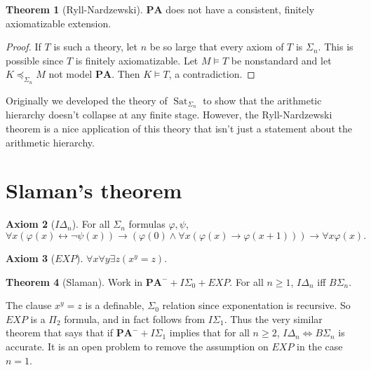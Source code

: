 \documentclass[12pt]{report}
\renewcommand{\iff}{\leftrightarrow}
\newcommand{\PA}{\mathbf{PA}}
\DeclareMathOperator{\Sat}{Sat}
\theoremstyle{definition}
\newtheorem{theorem}{Theorem}[chapter]
\newtheorem{axiom}[theorem]{Axiom}
\begin{document}
\begin{theorem}[Ryll-Nardzewski]
$\PA$ does not have a consistent, finitely axiomatizable extension.
\end{theorem}
\begin{proof}
If $T$ is such a theory, let $n$ be so large that every axiom of $T$ is $\Sigma_n$. This is possible since $T$ is finitely axiomatizable. Let $M \models T$ be nonstandard and let $K \preceq_{\Sigma_n} M$ not model $\PA$. Then $K \models T$, a contradiction.
\end{proof}

Originally we developed the theory of $\Sat_{\Sigma_n}$ to show that the arithmetic hierarchy doesn't collapse at any finite stage. However, the Ryll-Nardzewski theorem is a nice application of this theory that isn't just a statement about the arithmetic hierarchy.

\section{Slaman's theorem}
\begin{axiom}[$I\Delta_n$]
For all $\Sigma_n$ formulas $\varphi,\psi$,
$$\forall x(\varphi(x)\iff\neg\psi(x))\to (\varphi(0)\wedge\forall x(\varphi(x)\to\varphi(x+1)))\to\forall x\varphi(x).$$
\end{axiom}
\begin{axiom}[$EXP$]
$\forall x\forall y\exists z(x^y=z)$.
\end{axiom}
\begin{theorem}[Slaman]
Work in $\PA^-+I\Sigma_0+EXP$. For all $n \geq 1$, $I\Delta_n$ iff $B\Sigma_n$.
\end{theorem}
The clause $x^y=z$ is a definable, $\Sigma_0$ relation since exponentation is recursive. So $EXP$ is a $\Pi_2$ formula, and in fact follows from $I\Sigma_1$. Thus the very similar theorem that says that if $\PA^-+I\Sigma_1$ implies that for all $n \geq 2$, $I\Delta_n \Leftrightarrow B\Sigma_n$ is accurate. It is an open problem to remove the assumption on $EXP$ in the case $n = 1$.
\end{document}
